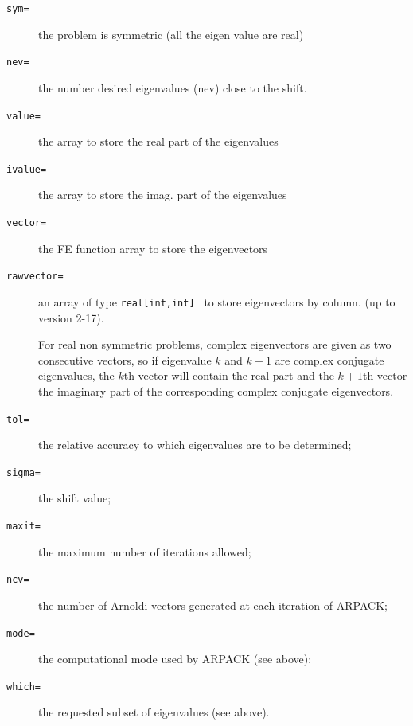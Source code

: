 \documentclass[a4paper,twoside,12pt]{book}
\begin{document}
\begin{description}
          \item[\texttt{sym=}] 
          the problem is symmetric (all the eigen value are real)
          \item[\texttt{nev=}] 
          the number desired eigenvalues (nev)  close to the shift.
        \item[\texttt{value=}]  
        the array to store the real part of the eigenvalues
         \item[\texttt{ivalue=}]   
         the array to store the imag. part of the eigenvalues
         \item[\texttt{vector=}]   
         the  FE function array to store the eigenvectors
         \item[\texttt{rawvector=}]  
          an array of type \texttt{real[int,int] } to store eigenvectors by column. (up to version 2-17).

 For real non symmetric problems, complex eigenvectors are given as two consecutive vectors, so if eigenvalue $k$ and $k+1$ are complex conjugate eigenvalues, the $k$th vector will contain the real part and the $k+1$th vector the imaginary part of the corresponding complex conjugate eigenvectors.

         \item[\texttt{tol=}]  
         the relative accuracy to which eigenvalues are to be determined;
         \item[\texttt{sigma=}]    the shift value;
         \item[\texttt{maxit=}]    the maximum number of iterations allowed;
         \item[\texttt{ncv=}]     the number of Arnoldi vectors generated at each iteration of ARPACK;
         \item[\texttt{mode=}]     the computational mode used by ARPACK (see above);
         \item[\texttt{which=}]     the  requested subset of eigenvalues (see above).
 \end{description}
\end{document}
